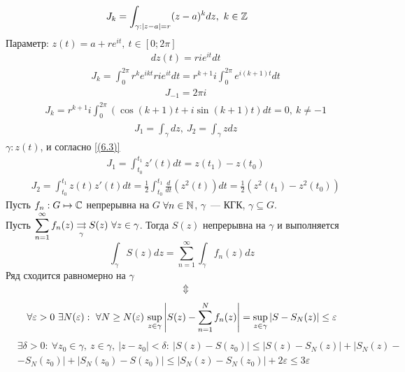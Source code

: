 \example
\begin{align*}
  &J_k = \int_{\gamma: \left| z-a \right| = r} (z-a)^k dz, \ k \in \mathbb{Z}
\end{align*}
Параметр: $z(t)= a+re^{it}, \ t \in [0;2\pi]$
\begin{align*}
  & dz(t) = rie^{it}dt
\end{align*}
\begin{align*}
  &J_k = \int_{0}^{2\pi} r^ke^{ikt}rie^{it}dt = r^{k+1}i\int_{0}^{2\pi}e^{i(k+1)t} dt
\end{align*}
\begin{align*}
  &J_{-1} = 2 \pi i
\end{align*}
\begin{align*}
  &J_k = r^{k+1}i\int_{0}^{2\pi} \left( \cos(k+1)t + i \sin(k+1)t \right) dt = 0, \ k \neq -1
\end{align*}
\example
\begin{align*}
  &J_1 = \int_{\gamma} dz, \ J_2 = \int_{\gamma}z dz
\end{align*}
$\gamma: z(t)$, и согласно \eqref{(6.3)}
\begin{align*}
  &J_1 = \int_{t_0}^{t_1} z'(t)dt = z(t_1) - z(t_0)
\end{align*}
\begin{align*}
  &J_2 = \int_{t_0}^{t_1} z(t)z'(t)dt = \frac{1}{2}\int_{t_0}^{t_1}\frac{d}{dt}\left( z^2(t) \right)dt = \frac{1}{2}\left( z^2(t_1) - z^2(t_0) \right)
\end{align*}
\theorem
Пусть $f_n: G \mapsto \mathbb{C}$ непрерывна на $G$ $\forall n \in \mathbb{N}$, $\gamma$~---
КГК, $\gamma \subseteq G$.
\\
Пусть $\displaystyle \sum_{n=1}^{\infty}f_n(z) \underset{\gamma}{\rightrightarrows} S(z)
\ \forall z \in \gamma$.
Тогда $S(z)$ непрерывна на $\gamma$ и выполняется
\begin{equation} \label{(6.7)}
    \int_{\gamma}S(z) dz = \sum_{n=1}^{\infty}\int_{\gamma}f_n(z)dz
\end{equation}
\pr
Ряд сходится равномерно на $\gamma$
\begin{align*}
  & \Updownarrow
\end{align*}
\begin{equation} \label{(6.8)}
    \forall \varepsilon > 0 \ \exists N(\varepsilon): \ \forall N\geq N(\varepsilon) \ \underset{z \in \gamma}{\sup} \left| S(z) - \sum_{n = 1}^{N}f_n(z) \right| = \underset{z \in \gamma}{\sup} \left|{S - S_N(z)}\right| \leq \varepsilon
\end{equation}
\begin{align*}
  &\exists \delta > 0: \ \forall z_0 \in \gamma, \ z \in \gamma, \ \left| z - z_0 \right| < \delta: \ \left| S(z) - S(z_0) \right| \leq \left| S(z) - S_N(z) \right| +  \left| S_N(z) - \right. \\
  &\left. - S_N(z_0) \right| + \left| S_N(z_0) - S(z_0) \right| \leq \left| S_N(z) - S_N(z_0) \right| + 2 \varepsilon \leq 3 \varepsilon
\end{align*}
